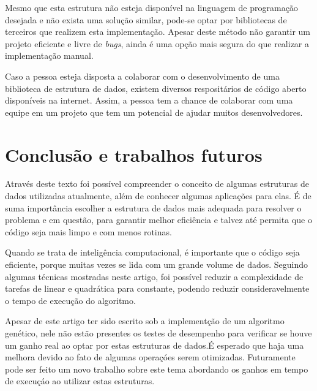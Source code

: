 \documentclass[12pt]{article}
\begin{document}
Mesmo que esta estrutura n\~{a}o esteja dispon\'{i}vel na linguagem de programa\c{c}\~{a}o desejada e n\~{a}o exista
uma solu\c{c}\~{a}o similar, pode-se optar por bibliotecas de terceiros que realizem esta implementa\c{c}\~{a}o. Apesar deste
m\'{e}todo n\~{a}o garantir um projeto eficiente e livre de \textit{bugs}, ainda \'{e} uma op\c{c}\~{a}o mais segura
do que realizar a implementa\c{c}\~{a}o manual.

Caso a pessoa esteja disposta a colaborar com o desenvolvimento de uma biblioteca de estrutura de dados, existem
diversos resposit\'{a}rios de c\'{o}digo aberto dispon\'{i}veis na internet. Assim, a pessoa tem a chance de
colaborar com uma equipe em um projeto que tem um potencial de ajudar muitos desenvolvedores.

\section{Conclus\~{a}o e trabalhos futuros}

Atrav\'{e}s deste texto foi poss\'{i}vel compreender o conceito de algumas estruturas de dados utilizadas
atualmente, al\'{e}m de conhecer algumas aplica\c{c}\~{o}es para elas. \'{E} de suma import\^{a}ncia escolher a estrutura
de dados mais adequada para resolver o problema e em quest\~{a}o, para garantir melhor efici\^{e}ncia e talvez at\'{e}
permita que o c\'{o}digo seja mais limpo e com menos rotinas.

Quando se trata de intelig\^{e}ncia computacional, \'{e} importante que o c\'{o}digo seja eficiente, porque muitas
vezes se lida com um grande volume de dados. Seguindo algumas t\'{e}cnicas mostradas neste artigo, foi poss\'{i}vel
reduzir a complexidade de tarefas de linear e quadr\'{a}tica para constante, podendo reduzir consideravelmente o tempo de
execu\c{c}\~{a}o do algoritmo.

Apesar de este artigo ter sido escrito sob a implement\c{c}\~{a}o de um algoritmo gen\'{e}tico, nele n\~{a}o est\~{a}o
presentes os testes de desempenho para verificar se houve um ganho real ao optar por estas estruturas de dados.\'{E} esperado
que haja uma melhora devido ao fato de algumas opera\c{c}\'{o}es serem otimizadas. Futuramente pode ser feito um novo
trabalho sobre este tema abordando os ganhos em tempo de execu\c{c}\'{a}o ao utilizar estas estruturas.



\end{document}
